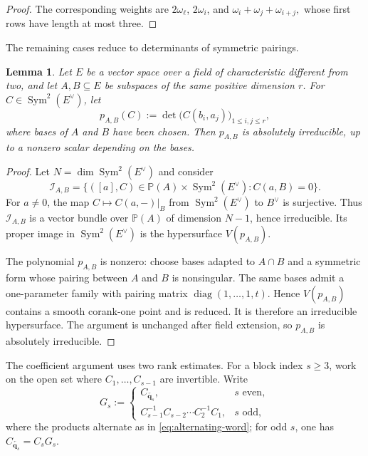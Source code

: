 \documentclass[11pt]{amsart}
\newtheorem{lemma}[theorem]{Lemma}
\theoremstyle{definition}
\theoremstyle{remark}
\newcommand{\Sym}{\operatorname{Sym}}
\begin{document}
\begin{proof}
The corresponding weights are
$2\omega_\ell$, $2\omega_i$, and $\omega_i+\omega_j+\omega_{i+j},$
whose first rows have length at most three.
\end{proof}

The remaining cases reduce to determinants of symmetric pairings.

\begin{lemma}\label{lem:symmetric-pairing-determinant}
Let $E$ be a vector space over a field of characteristic different from
two, and let $A,B\subseteq E$ be subspaces of the same positive
dimension $r$.  For $C\in\Sym^2(E^\vee)$, let
\[ p_{A,B}(C):=\det\bigl(C(b_i,a_j)\bigr)_{1\le i,j\le r}, \]
where bases of $A$ and $B$ have been chosen.  Then
$p_{A,B}$ is absolutely irreducible, up to a nonzero scalar depending
on the bases.
\end{lemma}

\begin{proof}
Let $N=\dim\Sym^2(E^\vee)$ and consider
\[ \mathcal I_{A,B} =\{([a],C)\in\mathbb P(A)\times\Sym^2(E^\vee):C(a,B)=0\}. \]
For $a\ne0$, the map $C\mapsto C(a,-)|_B$ from $\Sym^2(E^\vee)$ to
$B^\vee$ is surjective.  Thus $\mathcal I_{A,B}$ is a vector bundle over
$\mathbb P(A)$ of dimension $N-1$, hence irreducible.  Its proper image in
$\Sym^2(E^\vee)$ is the hypersurface $V(p_{A,B})$.

The polynomial $p_{A,B}$ is nonzero: choose bases adapted to
$A\cap B$ and a symmetric form whose pairing between $A$ and $B$ is
nonsingular.  The same bases admit a one-parameter family with pairing
matrix $\operatorname{diag}(1,\ldots,1,t)$.  Hence $V(p_{A,B})$ contains a
smooth corank-one point and is reduced.  It is therefore an irreducible
hypersurface.  The argument is unchanged after field extension, so
$p_{A,B}$ is absolutely irreducible.
\end{proof}

The coefficient argument uses two rank estimates.  For a block index $s\ge3$, work on the open set where
$C_1,\ldots,C_{s-1}$ are invertible.  Write
\begin{equation*}
G_s:=
 \begin{cases}
  C_{\overleftarrow{\mathbf q_s}},&s\text{ even},\\
  C_{s-1}^{-1}C_{s-2}\cdots C_2^{-1}C_1,
    &s\text{ odd},
 \end{cases}
\end{equation*}
where the products alternate as in \eqref{eq:alternating-word}; for odd
$s$, one has $C_{\overleftarrow{\mathbf q_s}}=C_sG_s$.
\end{document}
